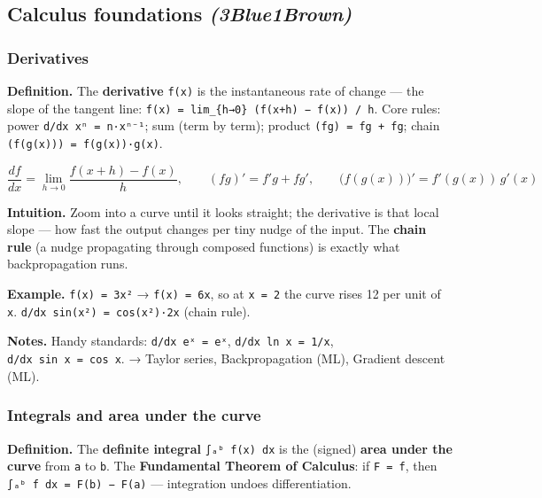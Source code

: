 \documentclass[
  10pt,
  letterpaper,
  onecolumn]{article}
\begin{document}
\hypertarget{calculus-foundations-3blue1brown}{%
\subsection{\texorpdfstring{Calculus foundations
\emph{(3Blue1Brown)}}{Calculus foundations (3Blue1Brown)}}\label{calculus-foundations-3blue1brown}}

\hypertarget{derivatives}{%
\subsubsection{Derivatives}\label{derivatives}}

\textbf{Definition.} The \textbf{derivative}
\texttt{f\textquotesingle{}(x)} is the instantaneous rate of change ---
the slope of the tangent line:
\texttt{f\textquotesingle{}(x)\ =\ lim\_\{h→0\}\ (f(x+h)\ −\ f(x))\ /\ h}.
Core rules: power \texttt{d/dx\ xⁿ\ =\ n·xⁿ⁻¹}; sum (term by term);
product
\texttt{(fg)\textquotesingle{}\ =\ f\textquotesingle{}g\ +\ fg\textquotesingle{}};
chain
\texttt{(f(g(x)))\textquotesingle{}\ =\ f\textquotesingle{}(g(x))·g\textquotesingle{}(x)}.

\begin{equation*}
\frac{df}{dx}=\lim_{h\to 0}\frac{f(x+h)-f(x)}{h},
\qquad
(fg)'=f'g+fg',
\qquad
\bigl(f(g(x))\bigr)'=f'(g(x))\,g'(x)
\end{equation*}

\textbf{Intuition.} Zoom into a curve until it looks straight; the
derivative is that local slope --- how fast the output changes per tiny
nudge of the input. The \textbf{chain rule} (a nudge propagating through
composed functions) is exactly what backpropagation runs.

\textbf{Example.} \texttt{f(x)\ =\ 3x²} →
\texttt{f\textquotesingle{}(x)\ =\ 6x}, so at \texttt{x\ =\ 2} the curve
rises 12 per unit of \texttt{x}. \texttt{d/dx\ sin(x²)\ =\ cos(x²)·2x}
(chain rule).

\textbf{Notes.} Handy standards: \texttt{d/dx\ eˣ\ =\ eˣ},
\texttt{d/dx\ ln\ x\ =\ 1/x}, \texttt{d/dx\ sin\ x\ =\ cos\ x}. → Taylor
series, Backpropagation (ML), Gradient descent (ML).

\hypertarget{integrals-and-area-under-the-curve}{%
\subsubsection{Integrals and area under the
curve}\label{integrals-and-area-under-the-curve}}

\textbf{Definition.} The \textbf{definite integral}
\texttt{∫ₐᵇ\ f(x)\ dx} is the (signed) \textbf{area under the curve}
from \texttt{a} to \texttt{b}. The \textbf{Fundamental Theorem of
Calculus}: if \texttt{F\textquotesingle{}\ =\ f}, then
\texttt{∫ₐᵇ\ f\ dx\ =\ F(b)\ −\ F(a)} --- integration undoes
differentiation.
\end{document}
